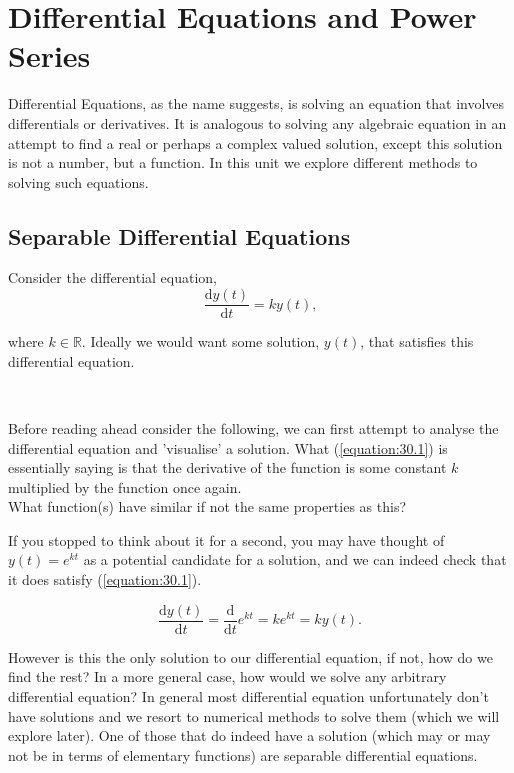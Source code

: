 \chapter{Differential Equations and Power Series}
Differential Equations, as the name suggests, is solving an equation that involves differentials or derivatives. It is analogous to solving any algebraic equation in an attempt to find a real or perhaps a complex valued solution, except this solution is not a number, but a function. In this unit we explore different methods to solving such equations.

\section{Separable Differential Equations}

Consider the differential equation,
\begin{equation}\label{equation:30.1}
\frac{\mathrm{d}y(t)}{\mathrm{d}t}=ky(t)\text{,}
\end{equation}

where $k \in \mathbb{R}$. Ideally we would want some solution, $y(t)$, that satisfies this differential equation.

\begin{thinking}{~}

Before reading ahead consider the following, we can first attempt to analyse the differential equation and 'visualise' a solution. What (\ref{equation:30.1}) is essentially saying is that the derivative of the function is some constant $k$ multiplied by the function once again.
\\
What function(s) have similar if not the same properties as this?
\end{thinking}

If you stopped to think about it for a second, you may have thought of $y(t)=e^{kt}$ as a potential candidate for a solution, and we can indeed check that it does satisfy (\ref{equation:30.1}).

$$\frac{\mathrm{d}y(t)}{\mathrm{d}t}=\frac{\mathrm{d}}{\mathrm{d}t}e^{kt}=ke^{kt}=ky(t)\text{.}$$

However is this the only solution to our differential equation, if not, how do we find the rest? In a more general case, how would we solve any arbitrary differential equation? In general most differential equation unfortunately don't have solutions and we resort to numerical methods to solve them (which we will explore later). One of those that do indeed have a solution (which may or may not be in terms of elementary functions) are separable differential equations.

